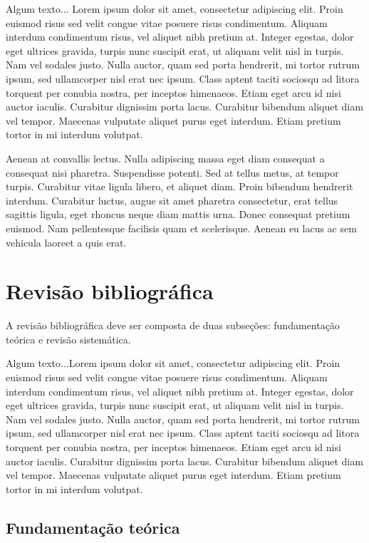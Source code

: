 \documentclass[quali]{mpit}
\begin{document}
Algum texto... Lorem ipsum dolor sit amet, consectetur adipiscing elit. Proin euismod risus sed velit congue vitae posuere risus condimentum. Aliquam interdum condimentum risus, vel aliquet nibh pretium at. Integer egestas, dolor eget ultrices gravida, turpis nunc suscipit erat, ut aliquam velit nisl in turpis. Nam vel sodales justo. Nulla auctor, quam sed porta hendrerit, mi tortor rutrum ipsum, sed ullamcorper nisl erat nec ipsum. Class aptent taciti sociosqu ad litora torquent per conubia nostra, per inceptos himenaeos. Etiam eget arcu id nisi auctor iaculis. Curabitur dignissim porta lacus. Curabitur bibendum aliquet diam vel tempor. Maecenas vulputate aliquet purus eget interdum. Etiam pretium tortor in mi interdum volutpat.

Aenean at convallis lectus. Nulla adipiscing massa eget diam consequat a consequat nisi pharetra. Suspendisse potenti. Sed at tellus metus, at tempor turpis. Curabitur vitae ligula libero, et aliquet diam. Proin bibendum hendrerit interdum. Curabitur luctus, augue sit amet pharetra consectetur, erat tellus sagittis ligula, eget rhoncus neque diam mattis urna. Donec consequat pretium euismod. Nam pellentesque facilisis quam et scelerisque. Aenean eu lacus ac sem vehicula laoreet a quis erat.

\chapter{Revisão bibliográfica}

A revisão bibliográfica deve ser composta de duas subseções: fundamentação teórica e revisão sistemática.

Algum texto...Lorem ipsum dolor sit amet, consectetur adipiscing elit. Proin euismod risus sed velit congue vitae posuere risus condimentum. Aliquam interdum condimentum risus, vel aliquet nibh pretium at. Integer egestas, dolor eget ultrices gravida, turpis nunc suscipit erat, ut aliquam velit nisl in turpis. Nam vel sodales justo. Nulla auctor, quam sed porta hendrerit, mi tortor rutrum ipsum, sed ullamcorper nisl erat nec ipsum. Class aptent taciti sociosqu ad litora torquent per conubia nostra, per inceptos himenaeos. Etiam eget arcu id nisi auctor iaculis. Curabitur dignissim porta lacus. Curabitur bibendum aliquet diam vel tempor. Maecenas vulputate aliquet purus eget interdum. Etiam pretium tortor in mi interdum volutpat.

\section{Fundamentação teórica}
\end{document}
